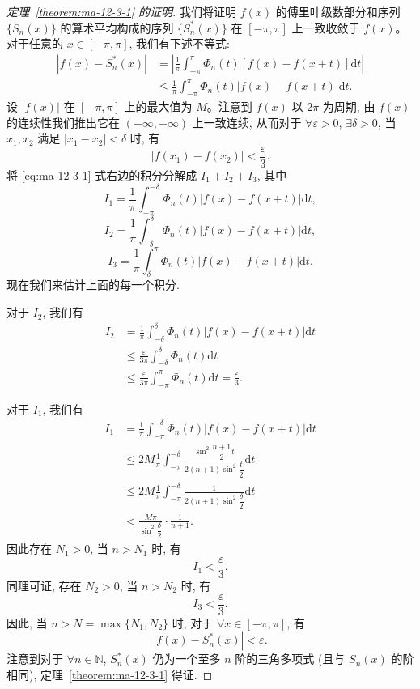 \begin{proof}[{定理~\ref{theorem:ma-12-3-1} 的证明}]
我们将证明 $f(x)$ 的傅里叶级数部分和序列 $\{S_n(x)\}$ 的算术平均构成的序列 $\{S_n^*(x)\}$ 在 $[-\pi,\pi]$ 上一致收敛于 $f(x)$。对于任意的 $x\in[-\pi,\pi]$, 我们有下述不等式:
\begin{equation}
\begin{aligned}
  |f(x)-S_n^*(x)|
  &=\left|\frac1\pi\int_{-\pi}^{\pi}\Phi_n(t)[f(x)-f(x+t)]\mathrm dt\right|\\
  &\leqslant\frac1\pi\int_{-\pi}^{\pi}\Phi_n(t)|f(x)-f(x+t)|\mathrm dt.
\end{aligned}
\label{eq:ma-12-3-1}
\end{equation}
设 $|f(x)|$ 在 $[-\pi,\pi]$ 上的最大值为 $M$。注意到 $f(x)$ 以 $2\pi$ 为周期, 由 $f(x)$ 的连续性我们推出它在 $(-\infty,+\infty)$ 上一致连续, 从而对于 $\forall\varepsilon>0$, $\exists\delta>0$, 当 $x_1,x_2$ 满足 $|x_1-x_2|<\delta$ 时, 有
\[
  |f(x_1)-f(x_2)|<\frac{\varepsilon}{3}.
\]
将 \eqref{eq:ma-12-3-1} 式右边的积分分解成 $I_1+I_2+I_3$, 其中
\[
  I_1=\frac1\pi\int_{-\pi}^{-\delta}\Phi_n(t)|f(x)-f(x+t)|\mathrm dt,
\]
\[
  I_2=\frac1\pi\int_{-\delta}^{\delta}\Phi_n(t)|f(x)-f(x+t)|\mathrm dt,
\]
\[
  I_3=\frac1\pi\int_{\delta}^{\pi}\Phi_n(t)|f(x)-f(x+t)|\mathrm dt.
\]
现在我们来估计上面的每一个积分.

对于 $I_2$, 我们有
\[
\begin{aligned}
  I_2
  &=\frac1\pi\int_{-\delta}^{\delta}\Phi_n(t)|f(x)-f(x+t)|\mathrm dt\\
  &\leqslant\frac{\varepsilon}{3\pi}\int_{-\delta}^{\delta}\Phi_n(t)\mathrm dt\\
  &\leqslant\frac{\varepsilon}{3\pi}\int_{-\pi}^{\pi}\Phi_n(t)\mathrm dt
  =\frac{\varepsilon}{3}.
\end{aligned}
\]

对于 $I_1$, 我们有
\[
\begin{aligned}
  I_1
  &=\frac1\pi\int_{-\pi}^{-\delta}\Phi_n(t)|f(x)-f(x+t)|\mathrm dt\\
  &\leqslant 2M\frac1\pi\int_{-\pi}^{-\delta}
  \frac{\sin^2\dfrac{n+1}{2}t}{2(n+1)\sin^2\dfrac t2}\mathrm dt\\
  &\leqslant 2M\frac1\pi\int_{-\pi}^{-\delta}
  \frac{1}{2(n+1)\sin^2\dfrac\delta2}\mathrm dt\\
  &<\frac{M\pi}{\sin^2\dfrac\delta2}\cdot\frac1{n+1}.
\end{aligned}
\]
因此存在 $N_1>0$, 当 $n>N_1$ 时, 有
\[
  I_1<\frac{\varepsilon}{3}.
\]
同理可证, 存在 $N_2>0$, 当 $n>N_2$ 时, 有
\[
  I_3<\frac{\varepsilon}{3}.
\]
因此, 当 $n>N=\max\{N_1,N_2\}$ 时, 对于 $\forall x\in[-\pi,\pi]$, 有
\[
  |f(x)-S_n^*(x)|<\varepsilon.
\]
注意到对于 $\forall n\in\mathbb N$, $S_n^*(x)$ 仍为一个至多 $n$ 阶的三角多项式 (且与 $S_n(x)$ 的阶相同), 定理~\ref{theorem:ma-12-3-1} 得证.
\end{proof}


